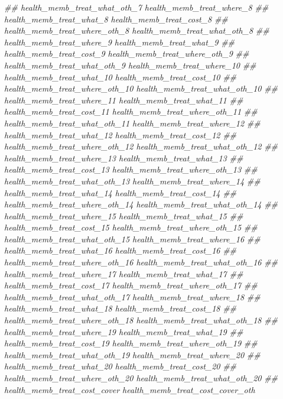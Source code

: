 \documentclass[
]{article}
\newenvironment{Shaded}{\begin{snugshade}}{\end{snugshade}}
\newcommand{\CommentTok}[1]{\textcolor[rgb]{0.56,0.35,0.01}{\textit{#1}}}
\begin{document}
\begin{Shaded}
\begin{Highlighting}[]
\CommentTok{##      health_memb_treat_what_oth_7 health_memb_treat_where_8}
\CommentTok{##      health_memb_treat_what_8 health_memb_treat_cost_8}
\CommentTok{##      health_memb_treat_where_oth_8 health_memb_treat_what_oth_8}
\CommentTok{##      health_memb_treat_where_9 health_memb_treat_what_9}
\CommentTok{##      health_memb_treat_cost_9 health_memb_treat_where_oth_9}
\CommentTok{##      health_memb_treat_what_oth_9 health_memb_treat_where_10}
\CommentTok{##      health_memb_treat_what_10 health_memb_treat_cost_10}
\CommentTok{##      health_memb_treat_where_oth_10 health_memb_treat_what_oth_10}
\CommentTok{##      health_memb_treat_where_11 health_memb_treat_what_11}
\CommentTok{##      health_memb_treat_cost_11 health_memb_treat_where_oth_11}
\CommentTok{##      health_memb_treat_what_oth_11 health_memb_treat_where_12}
\CommentTok{##      health_memb_treat_what_12 health_memb_treat_cost_12}
\CommentTok{##      health_memb_treat_where_oth_12 health_memb_treat_what_oth_12}
\CommentTok{##      health_memb_treat_where_13 health_memb_treat_what_13}
\CommentTok{##      health_memb_treat_cost_13 health_memb_treat_where_oth_13}
\CommentTok{##      health_memb_treat_what_oth_13 health_memb_treat_where_14}
\CommentTok{##      health_memb_treat_what_14 health_memb_treat_cost_14}
\CommentTok{##      health_memb_treat_where_oth_14 health_memb_treat_what_oth_14}
\CommentTok{##      health_memb_treat_where_15 health_memb_treat_what_15}
\CommentTok{##      health_memb_treat_cost_15 health_memb_treat_where_oth_15}
\CommentTok{##      health_memb_treat_what_oth_15 health_memb_treat_where_16}
\CommentTok{##      health_memb_treat_what_16 health_memb_treat_cost_16}
\CommentTok{##      health_memb_treat_where_oth_16 health_memb_treat_what_oth_16}
\CommentTok{##      health_memb_treat_where_17 health_memb_treat_what_17}
\CommentTok{##      health_memb_treat_cost_17 health_memb_treat_where_oth_17}
\CommentTok{##      health_memb_treat_what_oth_17 health_memb_treat_where_18}
\CommentTok{##      health_memb_treat_what_18 health_memb_treat_cost_18}
\CommentTok{##      health_memb_treat_where_oth_18 health_memb_treat_what_oth_18}
\CommentTok{##      health_memb_treat_where_19 health_memb_treat_what_19}
\CommentTok{##      health_memb_treat_cost_19 health_memb_treat_where_oth_19}
\CommentTok{##      health_memb_treat_what_oth_19 health_memb_treat_where_20}
\CommentTok{##      health_memb_treat_what_20 health_memb_treat_cost_20}
\CommentTok{##      health_memb_treat_where_oth_20 health_memb_treat_what_oth_20}
\CommentTok{##      health_memb_treat_cost_cover health_memb_treat_cost_cover_oth}

\end{Highlighting}
\end{Shaded}
\end{document}
